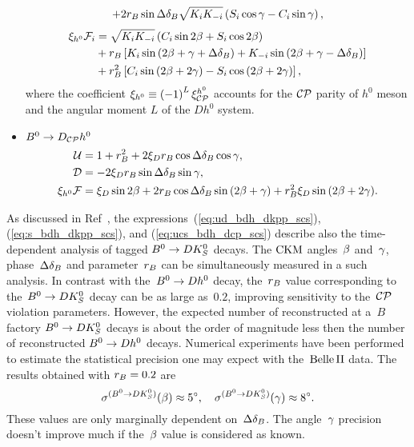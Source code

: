 \documentclass[a4paper,11pt]{article}
\begin{document}
\begin{itemize}
\begin{subequations}
\begin{align}
   + 2r_{B}\sin{\Delta\delta_{B}}\sqrt{K_iK_{-i}}\left( S_i\cos{\gamma} - C_i\sin{\gamma} \right),
  \end{align}
 \end{subequations}
 \begin{equation}\label{eq:s_bdh_dkpp_scs}
  \begin{split}
   \xi_{h^0}\mathcal{F}_{i} 
    &= \sqrt{K_iK_{-i}}\left( C_i\sin{2\beta} + S_i\cos{2\beta} \right) \\
    &+r_{B}\left[K_i\sin{\left(2\beta+ \gamma+ \Delta\delta_{B}\right)} +
                              K_{-i}\sin{\left(2\beta+ \gamma- \Delta\delta_{B}\right)} \right] \\
    &+r_{B}^2\left[C_i\sin{\left(2\beta+ 2\gamma\right)} -
                                 S_i\cos{\left(2\beta+ 2\gamma\right)}\right],
  \end{split}
 \end{equation}
 where the coefficient $\xi_{h^0}\equiv\left( -1 \right)^L\xi_{\mathcal{CP}}^{h^0}$ accounts for 
 the $\mathcal{CP}$ parity of $h^0$ meson and the angular moment $L$ of the $Dh^0$ system.
 \item $B^0\to D_{\mathcal{CP}} h^0$
 \begin{subequations}\label{eq:ucs_bdh_dcp_scs}
 \begin{align}
  \label{eq:u_bdh_dcp_scs}
  \mathcal{U} &= 1 + r_{B}^2 + 2\xi_Dr_{B}\cos{\Delta\delta_{B}}\cos{\gamma}, \\ 
  \label{eq:c_bdh_dcp_scs}
  \mathcal{D} &= - 2\xi_Dr_{B}\sin{\Delta\delta_{B}}\sin{\gamma}, \\
  \label{eq:s_bdh_dcp_scs}
  \xi_{h^0}\mathcal{F} &= \xi_D\sin{2\beta} + 2r_{B}\cos{\Delta\delta_{B}}\sin{\left(2\beta+ \gamma\right)}
 + r_{B}^2\xi_D\sin{\left(2\beta+2\gamma\right)}.
 \end{align}
\end{subequations}
\end{itemize}

As discussed in Ref~\cite{gronau_bdks}, the expressions~(\ref{eq:ud_bdh_dkpp_scs}), 
(\ref{eq:s_bdh_dkpp_scs}), and (\ref{eq:ucs_bdh_dcp_scs}) describe also the 
time-dependent analysis of tagged $B^0\to DK_S^0$ decays.  The $\mathrm{CKM}$ angles~$\beta$ 
and~$\gamma$, phase~$\Delta\delta_B$ and parameter~$r_{B}$ can be simultaneously measured in 
a such analysis.  In contrast with the~$B^0\to D h^0$ decay, the~$r_{B}$ value corresponding 
to the~$B^0\to DK_S^0$ decay can be as large as~$0.2$, improving sensitivity to the~$\mathcal{CP}$ 
violation parameters.  However, the expected number of reconstructed 
at a~$B$ factory $B^0\to DK_S^0$ decays is about the order of magnitude less then the 
number of reconstructed $B^0\to D h^0$ decays.  Numerical experiments have been performed 
to estimate the statistical precision one may expect with the~$\mathrm{Belle}\,\mathrm{II}$ data.  The results obtained with $r_{B}=0.2$ are
\begin{equation}\label{eq:precision_dks}
 \sigma^{(B^0\to DK_S^0)}(\beta)\approx 5{}^{\circ},\quad \sigma^{(B^0\to DK_S^0)}(\gamma)\approx 8{}^{\circ}.
\end{equation}
These values are only marginally dependent on~$\Delta\delta_B$. The angle~$\gamma$ 
precision doesn't improve much if the~$\beta$ value is considered as known.
\end{document}
